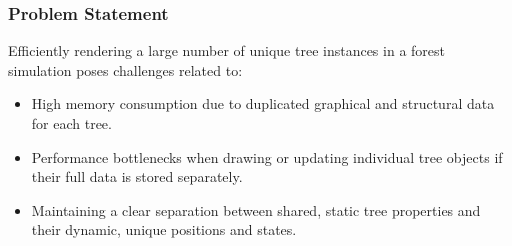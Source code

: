 \documentclass[12pt,a4paper]{article}
\begin{document}
\subsubsection{Problem Statement}
Efficiently rendering a large number of unique tree instances in a forest simulation poses challenges related to:
\begin{itemize}
    \item High memory consumption due to duplicated graphical and structural data for each tree.
    \item Performance bottlenecks when drawing or updating individual tree objects if their full data is stored separately.
    \item Maintaining a clear separation between shared, static tree properties and their dynamic, unique positions and states.
\end{itemize}
\end{document}
